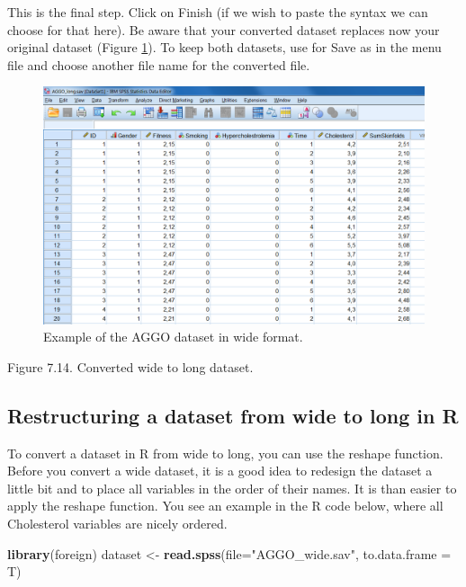 \documentclass[]{book}
\newenvironment{Shaded}{\begin{snugshade}}{\end{snugshade}}
\newcommand{\KeywordTok}[1]{\textcolor[rgb]{0.13,0.29,0.53}{\textbf{#1}}}
\newcommand{\DataTypeTok}[1]{\textcolor[rgb]{0.13,0.29,0.53}{#1}}
\newcommand{\StringTok}[1]{\textcolor[rgb]{0.31,0.60,0.02}{#1}}
\newcommand{\NormalTok}[1]{#1}
\begin{document}
This is the final step. Click on Finish (if we wish to paste the syntax
we can choose for that here). Be aware that your converted dataset
replaces now your original dataset (Figure \ref{fig:fig84}). To keep
both datasets, use for Save as in the menu file and choose another file
name for the converted file.

\begin{figure}

{\centering \includegraphics[width=0.9\linewidth]{images/fig7.14} 

}

\caption{Example of the AGGO dataset in wide format.}\label{fig:fig84}
\end{figure}

Figure 7.14. Converted wide to long dataset.

\subsection{Restructuring a dataset from wide to long in
R}\label{restructuring-a-dataset-from-wide-to-long-in-r}

To convert a dataset in R from wide to long, you can use the reshape
function. Before you convert a wide dataset, it is a good idea to
redesign the dataset a little bit and to place all variables in the
order of their names. It is than easier to apply the reshape function.
You see an example in the R code below, where all Cholesterol variables
are nicely ordered.

\begin{Shaded}
\begin{Highlighting}[]
\KeywordTok{library}\NormalTok{(foreign)}
\NormalTok{dataset <-}\StringTok{ }\KeywordTok{read.spss}\NormalTok{(}\DataTypeTok{file=}\StringTok{"AGGO_wide.sav"}\NormalTok{, }\DataTypeTok{to.data.frame =}\NormalTok{ T)}
\end{Highlighting}
\end{Shaded}
\end{document}
